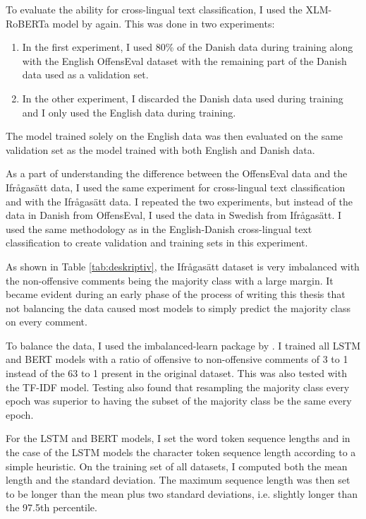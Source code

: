 \documentclass[nofilelist]{cslthse-msc}
\begin{document}
To evaluate the ability for cross-lingual text classification, I used the XLM-RoBERTa model by \citet{conneau2019unsupervised} again. This was done in two experiments:
\begin{enumerate}
    \item In the first experiment, I used  80\% of the Danish data  during training along with the English OffensEval dataset with the remaining part of the Danish data used as a validation set.
    \item  In the other experiment, I discarded the Danish data used during training and I only used the English data during training.
\end{enumerate}
 
The model trained solely on the English data was then evaluated on the same validation set as the model trained with both English and Danish data.

As a part of understanding the difference between the OffensEval data and the Ifrågasätt data, I used the same experiment for cross-lingual text classification and with the Ifrågasätt data. I repeated the two experiments, but instead of the data in Danish from OffensEval, I used the data in Swedish from Ifrågasätt. I used the same methodology as in the English-Danish cross-lingual text classification to create validation and training sets in this experiment.

As shown in Table \ref{tab:deskriptiv}, the Ifrågasätt dataset is very imbalanced with the non-offensive comments being the majority class with a large margin. It became evident during an early phase of the process of writing this thesis that not balancing the data caused most models to simply predict the majority class on every comment. 

To balance the data, I used the imbalanced-learn package by \citet{JMLR:v18:16-365}. I trained all LSTM and BERT models with a ratio of offensive to non-offensive comments of 3 to 1 instead of the 63 to 1 present in the original dataset. This was also tested with the TF-IDF model. Testing also found that resampling the majority class every epoch was superior to having the subset of the majority class be the same every epoch.

For the LSTM and BERT models, I set the word token sequence lengths and in the case of the LSTM models the character token sequence length according to a simple heuristic. On the training set of all datasets, I computed both the mean length and the standard deviation. The maximum sequence length was then set to be longer than the mean plus two standard deviations, i.e. slightly longer than the 97.5th percentile.
\end{document}
